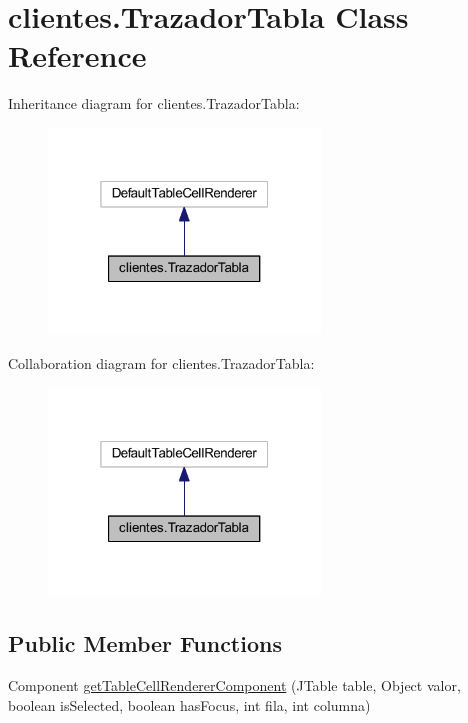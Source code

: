 \hypertarget{classclientes_1_1_trazador_tabla}{}\section{clientes.\+Trazador\+Tabla Class Reference}
\label{classclientes_1_1_trazador_tabla}


Inheritance diagram for clientes.\+Trazador\+Tabla\+:\nopagebreak
\begin{figure}[H]
\begin{center}
\leavevmode
\includegraphics[width=205pt]{classclientes_1_1_trazador_tabla__inherit__graph}
\end{center}
\end{figure}


Collaboration diagram for clientes.\+Trazador\+Tabla\+:\nopagebreak
\begin{figure}[H]
\begin{center}
\leavevmode
\includegraphics[width=205pt]{classclientes_1_1_trazador_tabla__coll__graph}
\end{center}
\end{figure}
\subsection*{Public Member Functions}
\begin{DoxyCompactItemize}
\item 
Component \mbox{\hyperlink{classclientes_1_1_trazador_tabla_ac6f2957d9ca9c22ad4a58a9dfe224424}{get\+Table\+Cell\+Renderer\+Component}} (J\+Table table, Object valor, boolean is\+Selected, boolean has\+Focus, int fila, int columna)
\end{DoxyCompactItemize}


